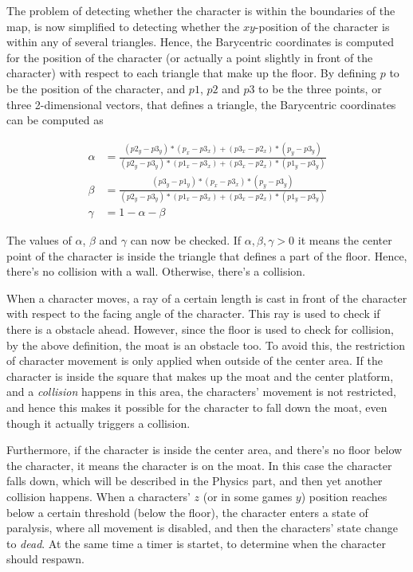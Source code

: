 \documentclass[12pt,a4paper,titlepage]{article}
\begin{document}
The problem of detecting whether the character is within the boundaries of the
map, is now simplified to detecting whether the $xy$-position of the
character is within any of several triangles. Hence, the Barycentric coordinates
is computed for the position of the character (or actually a point slightly
in front of the character) with respect to each triangle that make up the
floor. By defining $p$ to be the position of the character, and $p1$, $p2$
and $p3$ to be the three points, or three 2-dimensional vectors, that defines
a triangle, the Barycentric coordinates can be computed as

\begin{align*}
  \alpha &= \frac{(p2_y - p3_y) * (p_x - p3_x) + (p3_x - p2_x) * (p_y -
  p3_y)}{(p2_y - p3_y) * (p1_x - p3_x) + (p3_x - p2_x) * (p1_y - p3_y)}\\
  \beta &= \frac{(p3_y - p1_y) * (p_x - p3_x) * (p_y - p3_y)}{(p2_y -
  p3_y)*(p1_x-p3_x) + (p3_x - p2_x) * (p1_y - p3_y)}\\
  \gamma &= 1 - \alpha - \beta
\end{align*}

The values of $\alpha$, $\beta$ and $\gamma$ can now be checked. If
$\alpha,\beta,\gamma > 0$ it means the center point of the
character is inside the triangle that defines a part of the floor. Hence,
there's no collision with a wall. Otherwise, there's a collision.

When a character moves, a ray of a certain length is cast in front of the
character with respect to the facing angle of the character. This ray is used
to check if there is a obstacle ahead. However, since the floor is used to
check for collision, by the above definition, the moat is an obstacle too. To
avoid this, the restriction of character movement is only applied when
outside of the center area. If the character is inside the square that makes up the moat and
the center platform, and a \emph{collision} happens in this area, the characters'
movement is not restricted, and hence this makes it possible for the
character to fall down the moat, even though it actually triggers a
collision.

Furthermore, if the character is inside the center area, and there's no floor
below the character, it means the character is on the moat. In this case the
character falls down, which will be described in the Physics part, and then
yet another collision happens. When a characters' $z$ (or in some games $y$)
position reaches below a certain threshold (below the floor), the character
enters a state of paralysis, where all movement is disabled, and then the
characters' state change to \emph{dead}. At the same time a timer is startet, to
determine when the character should respawn.
\end{document}
